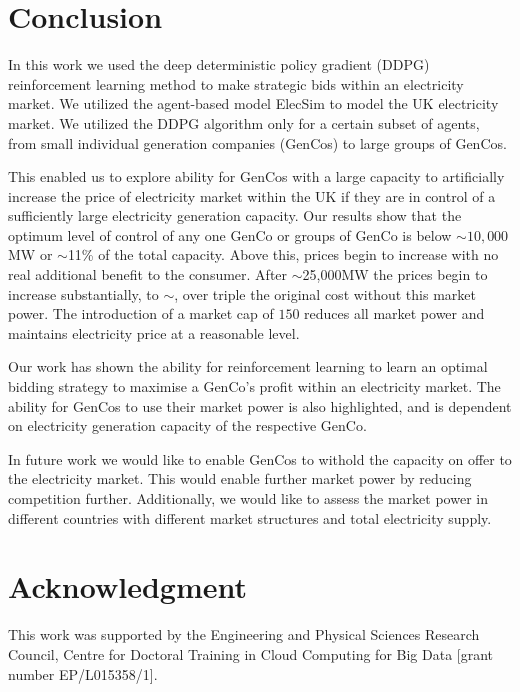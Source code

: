 \documentclass[conference]{IEEEtran}
\begin{document}

\section{Conclusion}
\label{sec:conclusion}

In this work we used the deep deterministic policy gradient (DDPG) reinforcement learning method to make strategic bids within an electricity market. We utilized the agent-based model ElecSim to model the UK electricity market. We utilized the DDPG algorithm only for a certain subset of agents, from small individual generation companies (GenCos) to large groups of GenCos. 

This enabled us to explore ability for GenCos with a large capacity to artificially increase the price of electricity market within the UK if they are in control of a sufficiently large electricity generation capacity. Our results show that the optimum level of control of any one GenCo or groups of GenCo is below ${\sim}10,000$MW or ${\sim}$11\% of the total capacity. Above this, prices begin to increase with no real additional benefit to the consumer. After ${\sim}$25,000MW the prices begin to increase substantially, to ${\sim}$, over triple the original cost without this market power. The introduction of a market cap of \textsterling$150$ reduces all market power and maintains electricity price at a reasonable level.

Our work has shown the ability for reinforcement learning to learn an optimal bidding strategy to maximise a GenCo's profit within an electricity market. The ability for GenCos to use their market power is also highlighted, and is dependent on electricity generation capacity of the respective GenCo.

In future work we would like to enable GenCos to withold the capacity on offer to the electricity market. This would enable further market power by reducing competition further.  Additionally, we would like to assess the market power in different countries with different market structures and total electricity supply.



\section{Acknowledgment}

This work was supported by the Engineering and Physical Sciences Research Council, Centre for Doctoral Training in Cloud Computing for Big Data [grant number EP/L015358/1].





\end{document}
